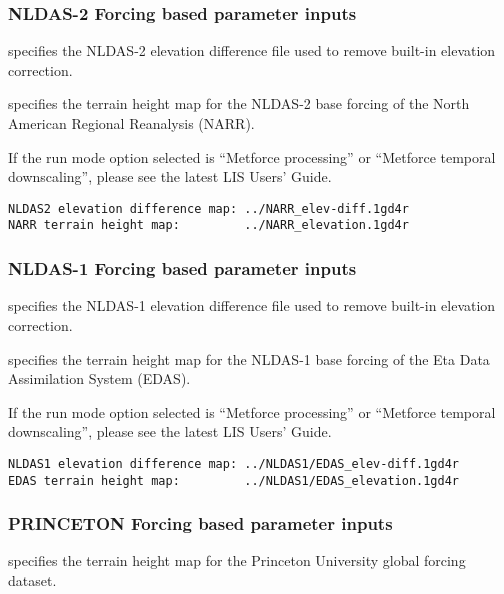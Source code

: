  
 \subsubsection{NLDAS-2 Forcing based parameter inputs}

  specifies the NLDAS-2 elevation 
 difference file used to remove built-in elevation correction.  

  specifies the terrain height map
 for the NLDAS-2 base forcing of the North American Regional
 Reanalysis (NARR).

 If the run mode option selected is ``Metforce processing'' or
 ``Metforce temporal downscaling'', please see the latest LIS Users'
 Guide.

 

 \begin{Verbatim}[frame=single]
NLDAS2 elevation difference map: ../NARR_elev-diff.1gd4r
NARR terrain height map:         ../NARR_elevation.1gd4r
 \end{Verbatim}

 
 \subsubsection{NLDAS-1 Forcing based parameter inputs}

  specifies the NLDAS-1 elevation 
 difference file used to remove built-in elevation correction.  

  specifies the terrain height map
 for the NLDAS-1 base forcing of the Eta Data Assimilation
 System (EDAS).

 If the run mode option selected is ``Metforce processing'' or
 ``Metforce temporal downscaling'', please see the latest LIS Users'
 Guide.

 

 \begin{Verbatim}[frame=single]
NLDAS1 elevation difference map: ../NLDAS1/EDAS_elev-diff.1gd4r
EDAS terrain height map:         ../NLDAS1/EDAS_elevation.1gd4r
 \end{Verbatim}

 
 \subsubsection{PRINCETON Forcing based parameter inputs}

  specifies the terrain height map
 for the Princeton University global forcing dataset.

